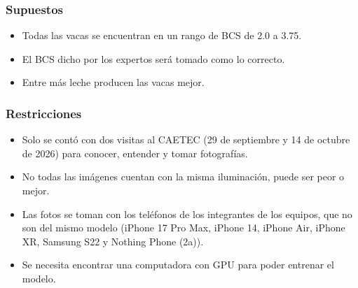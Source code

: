 \subsubsection{Supuestos}

\begin{itemize}
  \item Todas las vacas se encuentran en un rango de BCS de 2.0 a 3.75.
  \item El BCS dicho por los expertos será tomado como lo correcto.
  \item Entre más leche producen las vacas mejor.
\end{itemize}

\subsubsection{Restricciones}

\begin{itemize}
  \item Solo se contó con dos visitas al CAETEC (29 de septiembre y 14 de octubre de 2026) para conocer, entender y tomar fotografías.
  \item No todas las imágenes cuentan con la misma iluminación, puede ser peor o mejor.
  \item Las fotos se toman con los teléfonos de los integrantes de los equipos, que no son del mismo modelo (iPhone 17 Pro Max, iPhone 14, iPhone Air, iPhone XR, Samsung S22 y Nothing Phone (2a)).
  \item Se necesita encontrar una computadora con GPU para poder entrenar el modelo.
\end{itemize}
